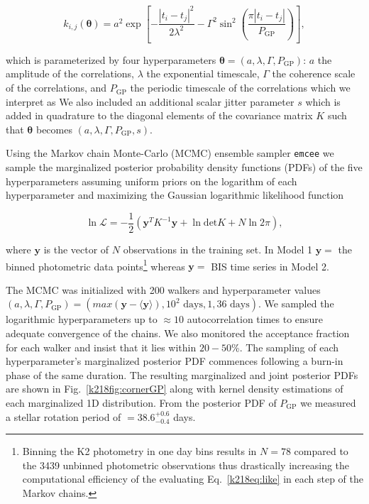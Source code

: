 \begin{equation}
k_{i,j}(\boldsymbol{\theta}) = a^2 \exp{\left[ - \frac{|t_i-t_j|^2}{2\lambda^2} -\Gamma^2
    \sin^2{\left(\frac{\pi|t_i-t_j|}{P_{\text{GP}}} \right)} \right]},
\label{k218eq:cov}
\end{equation}

\noindent which is parameterized by four hyperparameters
$\boldsymbol{\theta}=(a,\lambda,\Gamma,P_{\text{GP}})$: $a$ the amplitude of the
correlations, $\lambda$ the exponential timescale, $\Gamma$ the coherence scale of the
correlations, and $P_{\text{GP}}$ the periodic timescale of the correlations which we
interpret as  We also included an additional
scalar jitter parameter $s$ which is added in quadrature to the diagonal elements of the
covariance matrix $K$ such that $\boldsymbol{\theta}$ becomes $(a,\lambda,\Gamma,P_{\text{GP}},s)$.

Using the Markov chain Monte-Carlo (MCMC)
ensemble sampler \texttt{emcee} \citep{foremanmackey13} we sample the marginalized
posterior probability density functions (PDFs) of the five hyperparameters assuming 
uniform priors on the logarithm of each hyperparameter and maximizing the Gaussian
logarithmic likelihood function

\begin{equation}
\ln{\mathcal{L}} = -\frac{1}{2} \left( \mathbf{y}^T K^{-1} \mathbf{y}
+ \ln{\mathrm{det} K} + N \ln{2 \pi} \right),
\label{k218eq:like}
\end{equation}

\noindent where $\mathbf{y}$ is the vector of $N$ observations in the training set. In Model 1 $\mathbf{y}=$ 
the binned photometric data points\footnote{Binning
  the K2 photometry in one day bins results in $N=78$ compared to the 3439 unbinned photometric
  observations thus drastically increasing the computational efficiency of the evaluating Eq.~\ref{k218eq:like} in
  each step of the Markov chains.} whereas $\mathbf{y}=$ BIS time series in Model 2.

The MCMC was initialized with 200 walkers and hyperparameter values
$(a,\lambda,\Gamma,P_{\text{GP}})= (max(\mathbf{y}-\langle \mathbf{y} \rangle), 10^2\text{ days}, 1, 36\text{ days})$.
We sampled the logarithmic hyperparameters up to $\approx 10$ autocorrelation times to ensure
adequate convergence of the chains. We also monitored the acceptance fraction for each walker and insist
that it lies within $20-50$\%. The sampling of each hyperparameter's marginalized posterior PDF
commences following a burn-in phase of the same duration.
The resulting marginalized  and joint posterior PDFs are shown in Fig.~\ref{k218fig:cornerGP} along with
kernel density estimations of each marginalized 1D distribution. From the posterior
PDF of $P_{\text{GP}}$ we measured a stellar rotation period of \prot{} $= 38.6^{+0.6}_{-0.4}$ days.


